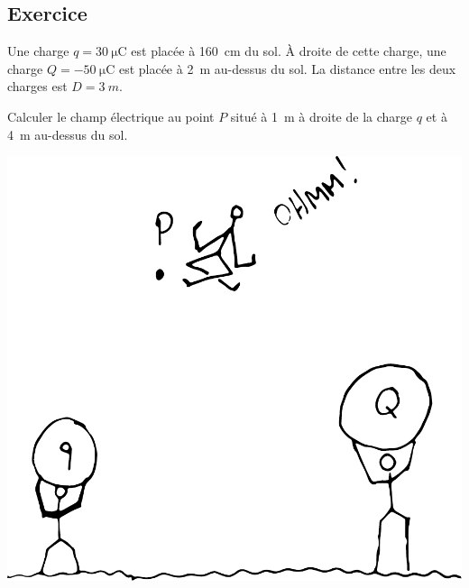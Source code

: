 \subsection*{Exercice}
  Une charge $q = \SI{30}{\micro\coulomb}$ est placée à \SI{160}{cm} du sol. À
  droite de cette charge, une charge $Q = \SI{-50}{\micro\coulomb}$ est placée
  à \SI{2}{m} au-dessus du sol. La distance entre les deux charges est $D =
  \SI{3}{m}$.

  Calculer le champ électrique au point $P$ situé à \SI{1}{m} à droite de la
  charge $q$ et à \SI{4}{m} au-dessus du sol.

  \begin{center}
    \includegraphics[scale=0.25]{02-champ-electrique/figures/champ-deux-charges-1.pdf}
  \end{center}

  \sectionline

